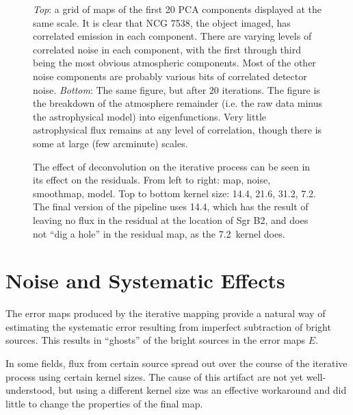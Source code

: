 \documentclass[12pt,preprint]{aastex}
\def\Figure#1#2#3#4{
\begin{figure}[htb]
\epsscale{#4}
\plotone{#1}
\caption{#2}
\label{#3}
\end{figure}
}
\begin{document}
\begin{figure}
  \caption{{\it Top}: a grid of maps of the first 20 PCA components
displayed at the same scale.  It is clear that NCG 7538, the object
imaged, has correlated emission in each component.  There are varying
levels of correlated noise in each component, with the first through
third being the most obvious atmospheric components.  Most of the
other noise components are probably various bits of correlated
detector noise. {\it Bottom}: The same figure, but after 20
iterations.  The figure is the breakdown of the atmosphere remainder
(i.e. the raw data minus the astrophysical model) into eigenfunctions.
Very little astrophysical flux remains at any level of correlation,
though there is some at large (few arcminute) scales.}
\label{fig:PCA_Graphical}

\end{figure}

\Figure{l001_deconvolutionkernelcompare}{The effect of deconvolution
on the iterative process can be seen in its effect on the
residuals. From left to right: map, noise, smoothmap, model. Top to
bottom kernel size: 14.4\arcsec, 21.6\arcsec, 31.2\arcsec,
7.2\arcsec. The final version of the pipeline uses 14.4\arcsec, which
has the result of leaving no flux in the residual at the location of
Sgr B2, and does not ``dig a hole'' in the residual map, as the
7.2\arcsec\ kernel does.}{fig:Deconvolution}{1.0}

\clearpage

\section{Noise and Systematic Effects}
\label{sec:Noise}

The error maps produced by the iterative mapping provide a natural way
of estimating the systematic error resulting from imperfect
subtraction of bright sources.  This results in ``ghosts'' of the
bright sources in the error maps $E$.  


In some fields, flux from certain source spread out over the course of
the iterative process using certain kernel sizes.  The cause of this
artifact are not yet well-understood, but using a different kernel
size was an effective workaround and did little to change the
properties of the final map.
\end{document}

